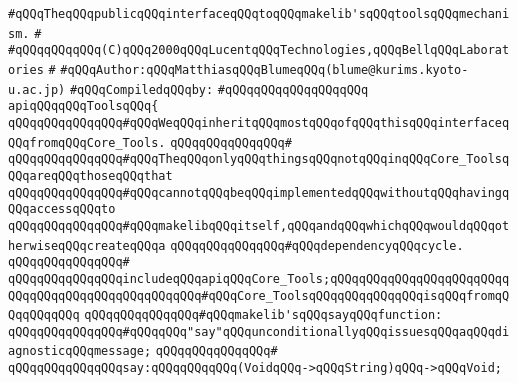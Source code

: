 \label{src/app/makelib/tools/main/public-tools.api}
\verb|#qQQqTheqQQqpublicqQQqinterfaceqQQqtoqQQqmakelib'sqQQqtoolsqQQqmechanism.|\newline
\verb|#|\newline
\verb|#qQQqqQQqqQQq(C)qQQq2000qQQqLucentqQQqTechnologies,qQQqBellqQQqLaboratories|\newline
\verb|#|\newline
\verb|#qQQqAuthor:qQQqMatthiasqQQqBlumeqQQq(blume@kurims.kyoto-u.ac.jp)|\newline
\newline
\verb|#qQQqCompiledqQQqby:|\newline
\verb|#qQQqqQQqqQQqqQQqqQQq|\newline
\newline
\verb|apiqQQqqQQqToolsqQQq{|\newline
\newline
\verb|qQQqqQQqqQQqqQQq#qQQqWeqQQqinheritqQQqmostqQQqofqQQqthisqQQqinterfaceqQQqfromqQQqCore_Tools.|\newline
\verb|qQQqqQQqqQQqqQQq#|\newline
\verb|qQQqqQQqqQQqqQQq#qQQqTheqQQqonlyqQQqthingsqQQqnotqQQqinqQQqCore_ToolsqQQqareqQQqthoseqQQqthat|\newline
\verb|qQQqqQQqqQQqqQQq#qQQqcannotqQQqbeqQQqimplementedqQQqwithoutqQQqhavingqQQqaccessqQQqto|\newline
\verb|qQQqqQQqqQQqqQQq#qQQqmakelibqQQqitself,qQQqandqQQqwhichqQQqwouldqQQqotherwiseqQQqcreateqQQqa|\newline
\verb|qQQqqQQqqQQqqQQq#qQQqdependencyqQQqcycle.|\newline
\verb|qQQqqQQqqQQqqQQq#|\newline
\verb|qQQqqQQqqQQqqQQqincludeqQQqapiqQQqCore_Tools;qQQqqQQqqQQqqQQqqQQqqQQqqQQqqQQqqQQqqQQqqQQqqQQqqQQq#qQQqCore_ToolsqQQqqQQqqQQqqQQqisqQQqfromqQQqqQQqqQQq|\newline
\newline
\verb|qQQqqQQqqQQqqQQq#qQQqmakelib'sqQQqsayqQQqfunction:|\newline
\verb|qQQqqQQqqQQqqQQq#qQQqqQQq"say"qQQqunconditionallyqQQqissuesqQQqaqQQqdiagnosticqQQqmessage;|\newline
\verb|qQQqqQQqqQQqqQQq#|\newline
\verb|qQQqqQQqqQQqqQQqsay:qQQqqQQqqQQq(VoidqQQq->qQQqString)qQQq->qQQqVoid;|\newline
